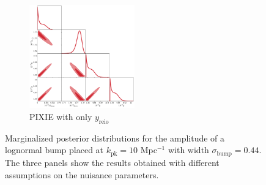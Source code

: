 \begin{figure}
    \vspace{1em}

    \begin{subfigure}{0.7\textheight}
        \centering
        \includegraphics[width=0.5\textwidth]{Constraints/LN_NN_reio.pdf}
        \caption{PIXIE with only $y_\text{reio}$}
        \label{fig:LN_NN_reio}        
    \end{subfigure}
    \caption{Marginalized posterior distributions for the amplitude of a lognormal bump placed at $k_\text{pk}=10$ Mpc$^{-1}$ with width $\sigma_\text{bump}=0.44$. The three panels show the results obtained with different assumptions on the nuisance parameters.}
    \label{fig:LN_all}
\end{figure}




